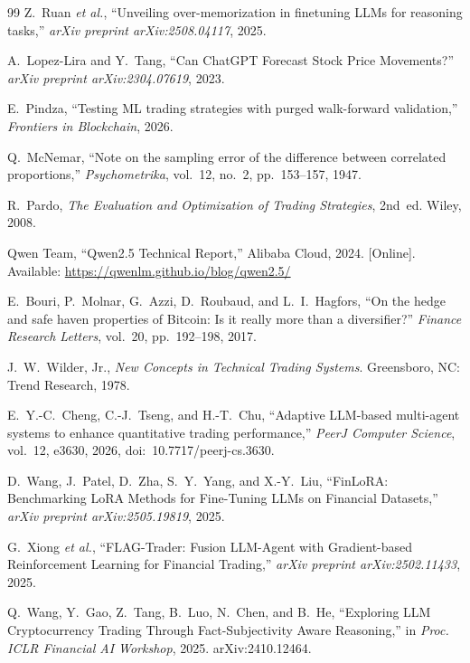 \documentclass[10pt,twocolumn]{article}
\begin{document}
\begin{thebibliography}{99}
Z.~Ruan \textit{et al.}, ``Unveiling over-memorization in finetuning LLMs for reasoning tasks,'' \textit{arXiv preprint arXiv:2508.04117}, 2025.

A.~Lopez-Lira and Y.~Tang, ``Can ChatGPT Forecast Stock Price Movements?'' \textit{arXiv preprint arXiv:2304.07619}, 2023.

E.~Pindza, ``Testing ML trading strategies with purged walk-forward validation,'' \textit{Frontiers in Blockchain}, 2026.

Q.~McNemar, ``Note on the sampling error of the difference between correlated proportions,'' \textit{Psychometrika}, vol.~12, no.~2, pp.~153--157, 1947.

R.~Pardo, \textit{The Evaluation and Optimization of Trading Strategies}, 2nd~ed. Wiley, 2008.

Qwen Team, ``Qwen2.5 Technical Report,'' Alibaba Cloud, 2024. [Online]. Available: \url{https://qwenlm.github.io/blog/qwen2.5/}

E.~Bouri, P.~Molnar, G.~Azzi, D.~Roubaud, and L.~I.~Hagfors, ``On the hedge and safe haven properties of Bitcoin: Is it really more than a diversifier?'' \textit{Finance Research Letters}, vol.~20, pp.~192--198, 2017.

J.~W.~Wilder, Jr., \textit{New Concepts in Technical Trading Systems}. Greensboro, NC: Trend Research, 1978.

E.~Y.-C.~Cheng, C.-J.~Tseng, and H.-T.~Chu, ``Adaptive LLM-based multi-agent systems to enhance quantitative trading performance,'' \textit{PeerJ Computer Science}, vol.~12, e3630, 2026, doi:~10.7717/peerj-cs.3630.

D.~Wang, J.~Patel, D.~Zha, S.~Y.~Yang, and X.-Y.~Liu, ``FinLoRA: Benchmarking LoRA Methods for Fine-Tuning LLMs on Financial Datasets,'' \textit{arXiv preprint arXiv:2505.19819}, 2025.

G.~Xiong \textit{et al.}, ``FLAG-Trader: Fusion LLM-Agent with Gradient-based Reinforcement Learning for Financial Trading,'' \textit{arXiv preprint arXiv:2502.11433}, 2025.

Q.~Wang, Y.~Gao, Z.~Tang, B.~Luo, N.~Chen, and B.~He, ``Exploring LLM Cryptocurrency Trading Through Fact-Subjectivity Aware Reasoning,'' in \textit{Proc. ICLR Financial AI Workshop}, 2025. arXiv:2410.12464.


\end{thebibliography}
\end{document}

